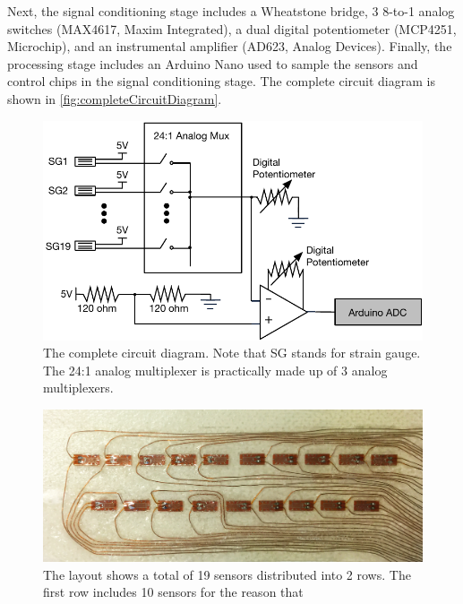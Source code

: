 \documentclass{sigchi}
\begin{document}
Next, the signal conditioning stage includes a Wheatstone bridge, 3 8-to-1 analog switches (MAX4617, Maxim Integrated), a dual digital potentiometer (MCP4251, Microchip), and an instrumental amplifier (AD623, Analog Devices). Finally, the processing stage includes an Arduino Nano used to sample the sensors and control chips in the signal conditioning stage. The complete circuit diagram is shown in \autoref{fig:completeCircuitDiagram}.

\begin{figure}
  \includegraphics[width=1\columnwidth]{figures/CompleteDiagram_v2.pdf}
  \caption{The complete circuit diagram. Note that SG stands for strain gauge. The 24:1 analog multiplexer is practically made up of 3 analog multiplexers.}
  \label{fig:completeCircuitDiagram}
\end{figure}

\begin{figure}
 \begin{center}
  \includegraphics[width=1\columnwidth]{figures/tie.png}
  \caption{The layout shows a total of 19 sensors distributed into 2 rows. The first row includes 10 sensors for the reason that}
  \label{fig:tie}
  \end{center}
\end{figure}
\end{document}
